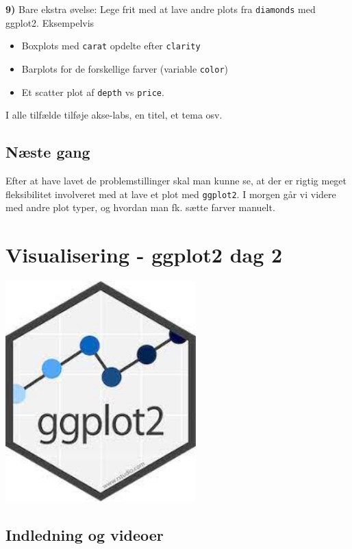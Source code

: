 \documentclass[
]{book}
\providecommand{\tightlist}{%
  \setlength{\itemsep}{0pt}\setlength{\parskip}{0pt}}
\begin{document}
\textbf{9)} Bare ekstra øvelse: Lege frit med at lave andre plots fra \texttt{diamonds} med ggplot2. Eksempelvis

\begin{itemize}
\tightlist
\item
  Boxplots med \texttt{carat} opdelte efter \texttt{clarity}
\item
  Barplots for de forskellige farver (variable \texttt{color})
\item
  Et scatter plot af \texttt{depth} vs \texttt{price}.
\end{itemize}

I alle tilfælde tilføje akse-labs, en titel, et tema osv.

\hypertarget{nuxe6ste-gang}{%
\section{Næste gang}\label{nuxe6ste-gang}}

Efter at have lavet de problemstillinger skal man kunne se, at der er rigtig meget fleksibilitet involveret med at lave et plot med \texttt{ggplot2}. I morgen går vi videre med andre plot typer, og hvordan man fk. sætte farver manuelt.

\hypertarget{visual2}{%
\chapter{Visualisering - ggplot2 dag 2}\label{visual2}}

\includegraphics[width=2.9in]{plots/ggplot2_logo}

\hypertarget{indledning-og-videoer}{%
\section{Indledning og videoer}\label{indledning-og-videoer}}
\end{document}
